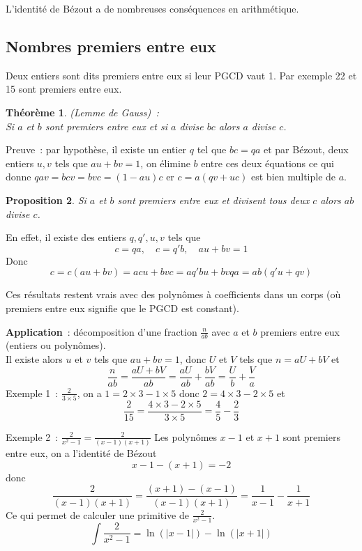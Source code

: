 \documentclass[a4paper,11pt]{book}
\newtheorem{thm}{Théorème}
\newtheorem{prop}[thm]{Proposition}
\begin{document}
\begin{giacjshere}
L'identit\'e de B\'ezout a de nombreuses cons\'equences en arithm\'etique.

\subsection{Nombres premiers entre eux}
Deux entiers sont dits premiers entre eux si leur PGCD vaut 1.
Par exemple 22 et 15 sont premiers entre eux.

\begin{thm} (Lemme de Gauss)~: \\
Si $a$ et $b$ sont premiers entre eux et si $a$
divise $bc$ alors $a$ divise $c$.
\end{thm}

Preuve~: par hypoth\`ese, il existe un entier $q$ tel que $bc=qa$
et par B\'ezout, deux entiers $u,v$ tels que $au+bv=1$, on \'elimine
$b$ entre ces deux \'equations ce qui donne
$qav=bcv=bvc=(1-au)c$ er $c=a(qv+uc)$ est bien multiple de $a$.

\begin{prop}
Si $a$ et $b$ sont premiers entre eux et divisent tous deux $c$
alors $ab$ divise $c$.
\end{prop}
En effet, il existe des entiers $q,q',u,v$ tels que 
$$ c=qa, \quad c=q'b, \quad au+bv=1$$
Donc
$$ c=c(au+bv)=acu+bvc=aq'bu+bvqa=ab(q'u+qv)$$

Ces r\'esultats restent vrais avec des polyn\^omes \`a coefficients
dans un corps (o\`u premiers entre eux signifie que le PGCD est
constant).

{\bf Application}~: d\'ecomposition d'une fraction $\frac{n}{ab}$
avec $a$ et $b$ premiers entre eux (entiers ou polyn\^omes).\\
Il existe alors $u$ et $v$ tels que $au+bv=1$, donc $U$ et $V$ tels
que $n=aU+bV$ et
$$ \frac{n}{ab} =
\frac{aU+bV}{ab}=\frac{aU}{ab}+\frac{bV}{ab}=\frac{U}{b}+\frac{V}{a} $$
Exemple 1~: $\frac{2}{3\times 5}$, on a $1=2\times 3-1 \times 5$
donc $2=4\times 3-2 \times 5$ et
$$ \frac{2}{15} = \frac{4\times 3-2 \times 5}{3 \times
  5}=\frac{4}{5}-\frac{2}{3} $$

Exemple 2~: $\frac{2}{x^2-1}=\frac{2}{(x-1)(x+1)}$
Les polyn\^omes $x-1$ et $x+1$ sont premiers entre eux, on a
l'identit\'e de B\'ezout
$$x-1 - (x+1) = -2$$
donc 
$$ \frac{2}{(x-1)(x+1)} = \frac{(x+1)-(x-1)}{(x-1)(x+1)}
= \frac{1}{x-1} - \frac{1}{x+1}$$
Ce qui permet de calculer une primitive de $\frac{2}{x^2-1}$.
$$ \int \frac{2}{x^2-1}= \ln(|x-1|)-\ln(|x+1|) $$


\end{giacjshere}
\end{document}
